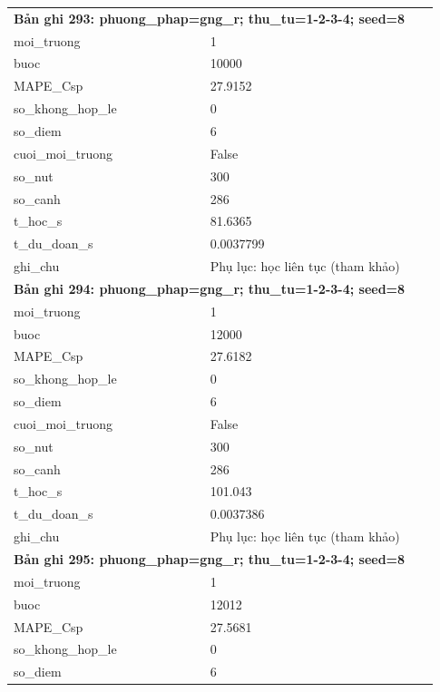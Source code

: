 \begin{longtable}{p{0.43\linewidth}p{0.50\linewidth}}
\midrule
\multicolumn{2}{p{0.95\linewidth}}{\textbf{Bản ghi 293: phuong\_phap=gng\_r; thu\_tu=1-2-3-4; seed=8}} \\
moi\_\allowbreak truong & 1 \\
buoc & 10000 \\
MAPE\_\allowbreak Csp & 27.9152 \\
so\_\allowbreak khong\_\allowbreak hop\_\allowbreak le & 0 \\
so\_\allowbreak diem & 6 \\
cuoi\_\allowbreak moi\_\allowbreak truong & False \\
so\_\allowbreak nut & 300 \\
so\_\allowbreak canh & 286 \\
t\_\allowbreak hoc\_\allowbreak s & 81.6365 \\
t\_\allowbreak du\_\allowbreak doan\_\allowbreak s & 0.0037799 \\
ghi\_\allowbreak chu & Phụ lục: học liên tục (tham khảo) \\
\midrule
\multicolumn{2}{p{0.95\linewidth}}{\textbf{Bản ghi 294: phuong\_phap=gng\_r; thu\_tu=1-2-3-4; seed=8}} \\
moi\_\allowbreak truong & 1 \\
buoc & 12000 \\
MAPE\_\allowbreak Csp & 27.6182 \\
so\_\allowbreak khong\_\allowbreak hop\_\allowbreak le & 0 \\
so\_\allowbreak diem & 6 \\
cuoi\_\allowbreak moi\_\allowbreak truong & False \\
so\_\allowbreak nut & 300 \\
so\_\allowbreak canh & 286 \\
t\_\allowbreak hoc\_\allowbreak s & 101.043 \\
t\_\allowbreak du\_\allowbreak doan\_\allowbreak s & 0.0037386 \\
ghi\_\allowbreak chu & Phụ lục: học liên tục (tham khảo) \\
\midrule
\multicolumn{2}{p{0.95\linewidth}}{\textbf{Bản ghi 295: phuong\_phap=gng\_r; thu\_tu=1-2-3-4; seed=8}} \\
moi\_\allowbreak truong & 1 \\
buoc & 12012 \\
MAPE\_\allowbreak Csp & 27.5681 \\
so\_\allowbreak khong\_\allowbreak hop\_\allowbreak le & 0 \\
so\_\allowbreak diem & 6 \\

\end{longtable}
